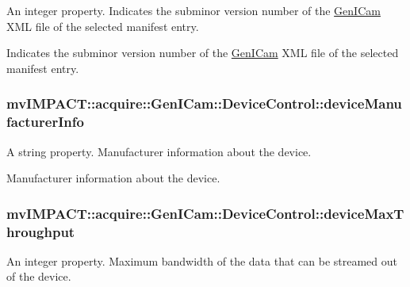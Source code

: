 An integer property. Indicates the subminor version number of the \hyperlink{namespacemv_i_m_p_a_c_t_1_1acquire_1_1_gen_i_cam}{Gen\+I\+Cam} X\+M\+L file of the selected manifest entry. 

Indicates the subminor version number of the \hyperlink{namespacemv_i_m_p_a_c_t_1_1acquire_1_1_gen_i_cam}{Gen\+I\+Cam} X\+M\+L file of the selected manifest entry. \hypertarget{classmv_i_m_p_a_c_t_1_1acquire_1_1_gen_i_cam_1_1_device_control_a0fb1fea197c3afdb2c0181b7724acd37}{
\subsubsection[{device\+Manufacturer\+Info}]{ mv\+I\+M\+P\+A\+C\+T\+::acquire\+::\+Gen\+I\+Cam\+::\+Device\+Control\+::device\+Manufacturer\+Info}}\label{classmv_i_m_p_a_c_t_1_1acquire_1_1_gen_i_cam_1_1_device_control_a0fb1fea197c3afdb2c0181b7724acd37}


A string property. Manufacturer information about the device. 

Manufacturer information about the device. \hypertarget{classmv_i_m_p_a_c_t_1_1acquire_1_1_gen_i_cam_1_1_device_control_a642ae01705aed49770f65e18da80e1a4}{
\subsubsection[{device\+Max\+Throughput}]{ mv\+I\+M\+P\+A\+C\+T\+::acquire\+::\+Gen\+I\+Cam\+::\+Device\+Control\+::device\+Max\+Throughput}}\label{classmv_i_m_p_a_c_t_1_1acquire_1_1_gen_i_cam_1_1_device_control_a642ae01705aed49770f65e18da80e1a4}


An integer property. Maximum bandwidth of the data that can be streamed out of the device. 

